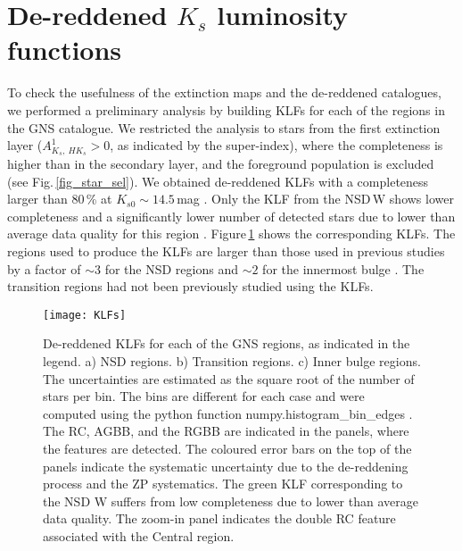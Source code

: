 \documentclass{aa}
\begin{document}
 

\section{De-reddened $K_s$ luminosity functions}

To check the usefulness of the extinction maps and the de-reddened  catalogues, we performed a preliminary analysis by building KLFs for each of the regions in the GNS catalogue. We restricted the analysis to stars from the first extinction layer ($A^1_{K_s,\ HK_s}>0$, as indicated by the super-index), where the completeness is higher than in the secondary layer, and the foreground population is excluded (see Fig.\,\ref{fig_star_sel}). We obtained de-reddened KLFs with a completeness larger than 80\,\% at $K_{s0}\sim14.5$\,mag \citep[according to the completeness $\sim80$\,\% at $K_s\sim16.3$\,mag, computed for the Central region in][]{Nogueras-Lara:2020aa}. Only the KLF from the NSD\,W shows lower completeness and a significantly lower number of detected stars due to lower than average data quality for this region \citep[see Table A.3. in][]{Nogueras-Lara:2019aa}. Figure\,\ref{KLFs} shows the corresponding KLFs. The regions used to produce the KLFs are larger than those used in previous studies by a factor of $\sim3$ for the NSD regions \citep{Nogueras-Lara:2019ad} and $\sim2$ for the innermost bulge \citep{Nogueras-Lara:2018ab}. The transition regions had not been previously studied using the KLFs. 

       \begin{figure}
   \texttt{[image: KLFs]}
   \caption{De-reddened KLFs for each of the GNS regions, as indicated in the legend. a) NSD regions. b) Transition regions. c) Inner bulge regions. The uncertainties are estimated as the square root of the number of stars per bin. The bins are different for each case and were computed using the python function numpy.histogram\_bin\_edges \citep{Harris:2020aa}. The RC, AGBB, and the RGBB  are indicated in the panels, where the features are detected. The coloured error bars on the top of the panels indicate the systematic uncertainty due to the de-reddening process and the ZP systematics. The green KLF corresponding to the NSD W suffers from low completeness due to lower than average data quality. The zoom-in panel indicates the double RC feature associated with the Central region.}

   \label{KLFs}
    \end{figure}
\end{document}
